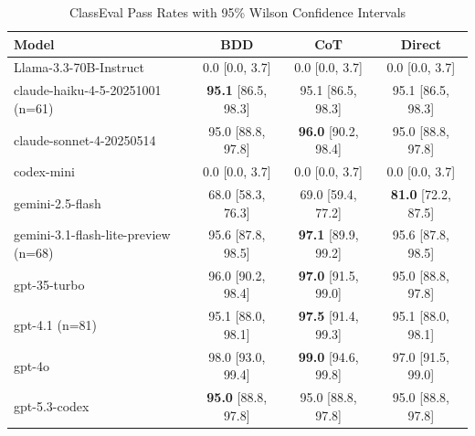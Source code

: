 \begin{table}[htbp]
\centering
\caption{ClassEval Pass Rates with 95\% Wilson Confidence Intervals}
\label{tab:classeval_full}
\begin{tabular}{lccc}
\toprule
Model & BDD & CoT & Direct \\
\midrule
Llama-3.3-70B-Instruct & 0.0 [0.0, 3.7] & 0.0 [0.0, 3.7] & 0.0 [0.0, 3.7] \\
claude-haiku-4-5-20251001 (n=61) & \textbf{95.1} [86.5, 98.3] & 95.1 [86.5, 98.3] & 95.1 [86.5, 98.3] \\
claude-sonnet-4-20250514 & 95.0 [88.8, 97.8] & \textbf{96.0} [90.2, 98.4] & 95.0 [88.8, 97.8] \\
codex-mini & 0.0 [0.0, 3.7] & 0.0 [0.0, 3.7] & 0.0 [0.0, 3.7] \\
gemini-2.5-flash & 68.0 [58.3, 76.3] & 69.0 [59.4, 77.2] & \textbf{81.0} [72.2, 87.5] \\
gemini-3.1-flash-lite-preview (n=68) & 95.6 [87.8, 98.5] & \textbf{97.1} [89.9, 99.2] & 95.6 [87.8, 98.5] \\
gpt-35-turbo & 96.0 [90.2, 98.4] & \textbf{97.0} [91.5, 99.0] & 95.0 [88.8, 97.8] \\
gpt-4.1 (n=81) & 95.1 [88.0, 98.1] & \textbf{97.5} [91.4, 99.3] & 95.1 [88.0, 98.1] \\
gpt-4o & 98.0 [93.0, 99.4] & \textbf{99.0} [94.6, 99.8] & 97.0 [91.5, 99.0] \\
gpt-5.3-codex & \textbf{95.0} [88.8, 97.8] & 95.0 [88.8, 97.8] & 95.0 [88.8, 97.8] \\
\bottomrule
\end{tabular}
\end{table}